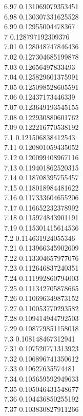 {6.97	0.131069079353451\\
6.98	0.130307331625528\\
6.99	0.12955004478367\\
7	0.128797192309376\\
7.01	0.128048747846436\\
7.02	0.127304685199878\\
7.03	0.12656497833493\\
7.04	0.125829601375991\\
7.05	0.125098528605591\\
7.06	0.12437173446339\\
7.07	0.123649193545155\\
7.08	0.122930880601762\\
7.09	0.122216770538192\\
7.1	0.121506838412543\\
7.11	0.120801059435052\\
7.12	0.120099408967116\\
7.13	0.119401862520315\\
7.14	0.118708395755457\\
7.15	0.118018984481622\\
7.16	0.117333604655206\\
7.17	0.116652232378992\\
7.18	0.115974843901191\\
7.19	0.115301415614536\\
7.2	0.114631924055346\\
7.21	0.113966345902609\\
7.22	0.113304657977076\\
7.23	0.112646837240351\\
7.24	0.111992860794003\\
7.25	0.111342705878665\\
7.26	0.110696349873152\\
7.27	0.110053770293582\\
7.28	0.109414944792503\\
7.29	0.108779851158018\\
7.3	0.108148467312941\\
7.31	0.107520771313923\\
7.32	0.106896741350612\\
7.33	0.10627635574481\\
7.34	0.105659592949633\\
7.35	0.105046431548677\\
7.36	0.104436850255192\\
7.37	0.103830827911266\\
}
